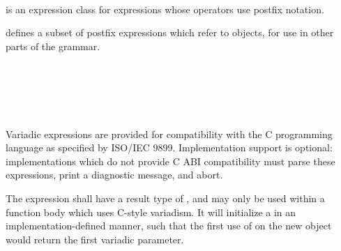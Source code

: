 
\begin{grammar}
 \\
	 \\
	 \\
	 \\
	 \\
	 \\
	 \\

 \\
	 \\
	 \\
	 \\
\end{grammar}

\specsubsubitem
{} is an expression class for expressions whose
operators use postfix notation.

\specsubsubitem
{} defines a subset of postfix expressions which
refer to objects, for use in other parts of the grammar.


\begin{grammar}
 \\
	 \terminal{(} \terminal{)} \\
	 \terminal{(}  \terminal{)} \\
	 \terminal{(}  \terminal{)} \\
\end{grammar}

\specsubsubitem
Variadic expressions are provided for compatibility with the C programming
language as specified by ISO/IEC 9899. Implementation support is optional:
implementations which do not provide C ABI compatibility must parse these
expressions, print a diagnostic message, and abort.


\specsubsubitem
The  expression shall have a result type of
, and may only be used within a function body which uses
C-style variadism. It will initialize a  in an
implementation-defined manner, such that the first use of  on
the new object would return the first variadic parameter.

